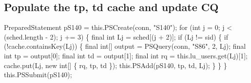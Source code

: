 \subsection{Populate the tp, td cache and update CQ}
\nwenddocs{}\endmoddef{}
PreparedStatement pS140 = this.PSCreate(conn, "S140");
for (int j = 0; j < (sched.length - 2); j += 3) \{
  final int Lj = sched[(j + 2)];
  if (Lj != sid) \{
    if (!cache.containsKey(Lj)) \{
      final int[] output = PSQuery(conn, "S86", 2, Lj);
      final int tp = output[0];
      final int td = output[1];
      final int rq = this.lu_users.get(Lj)[1];
      cache.put(Lj, new int[] \{ rq, tp, td \});
      this.PSAdd(pS140, tp, td, Lj);
    \}
  \}
\}
this.PSSubmit(pS140);
\nwendcode{}\nwdocspar

